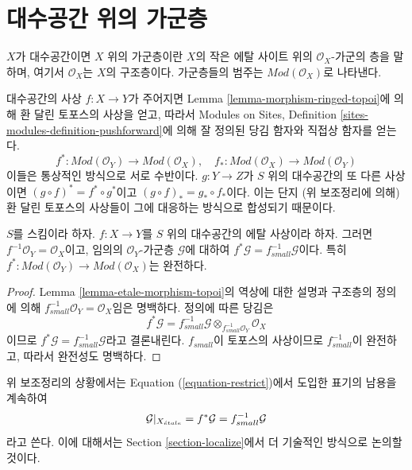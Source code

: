 \section{대수공간 위의 가군층}
\label{section-modules}

\noindent
$X$가 대수공간이면 $X$ 위의 가군층이란 $X$의 작은 에탈 사이트 위의
$\mathcal{O}_X$-가군의 층을 말하며, 여기서 $\mathcal{O}_X$는 $X$의
구조층이다. 가군층들의 범주는 $\textit{Mod}(\mathcal{O}_X)$로 나타낸다.

\medskip\noindent
대수공간의 사상 $f : X \to Y$가 주어지면 Lemma
\ref{lemma-morphism-ringed-topoi}에 의해 환 달린 토포스의 사상을 얻고,
따라서 Modules on Sites, Definition
\ref{sites-modules-definition-pushforward}에 의해 잘 정의된 당김 함자와
직접상 함자를 얻는다.
\begin{equation}
\label{equation-push-pull}
f^* :
\textit{Mod}(\mathcal{O}_Y)
\longrightarrow
\textit{Mod}(\mathcal{O}_X), \quad
f_* :
\textit{Mod}(\mathcal{O}_X)
\longrightarrow
\textit{Mod}(\mathcal{O}_Y)
\end{equation}
이들은 통상적인 방식으로 서로 수반이다.
$g : Y \to Z$가 $S$ 위의 대수공간의 또 다른 사상이면
$(g \circ f)^* = f^* \circ g^*$이고 $(g \circ f)_* = g_* \circ f_*$이다.
이는 단지 (위 보조정리에 의해) 환 달린 토포스의 사상들이 그에 대응하는
방식으로 합성되기 때문이다.

\begin{lemma}
\label{lemma-etale-exact-pullback}
$S$를 스킴이라 하자.
$f : X \to Y$를 $S$ 위의 대수공간의 에탈 사상이라 하자.
그러면 $f^{-1}\mathcal{O}_Y = \mathcal{O}_X$이고, 임의의
$\mathcal{O}_Y$-가군층 $\mathcal{G}$에 대하여
$f^*\mathcal{G} = f_{small}^{-1}\mathcal{G}$이다. 특히
$f^* : \textit{Mod}(\mathcal{O}_Y) \to \textit{Mod}(\mathcal{O}_X)$는
완전하다.
\end{lemma}

\begin{proof}
Lemma \ref{lemma-etale-morphism-topoi}의 역상에 대한 설명과 구조층의
정의에 의해 $f_{small}^{-1}\mathcal{O}_Y = \mathcal{O}_X$임은 명백하다.
정의에 따른 당김은
$$
f^*\mathcal{G} =
f_{small}^{-1}\mathcal{G} \otimes_{f_{small}^{-1}\mathcal{O}_Y}
\mathcal{O}_X
$$
이므로 $f^*\mathcal{G} = f_{small}^{-1}\mathcal{G}$라고 결론내린다.
$f_{small}$이 토포스의 사상이므로 $f_{small}^{-1}$이 완전하고,
따라서 완전성도 명백하다.
\end{proof}

\noindent
위 보조정리의 상황에서는 Equation (\ref{equation-restrict})에서 도입한
표기의 남용을 계속하여
\begin{equation}
\label{equation-restrict-modules}
\mathcal{G}|_{X_{\acute{e}tale}}
= f^*\mathcal{G}
= f_{small}^{-1}\mathcal{G}
\end{equation}
라고 쓴다. 이에 대해서는 Section \ref{section-localize}에서 더 기술적인
방식으로 논의할 것이다.

